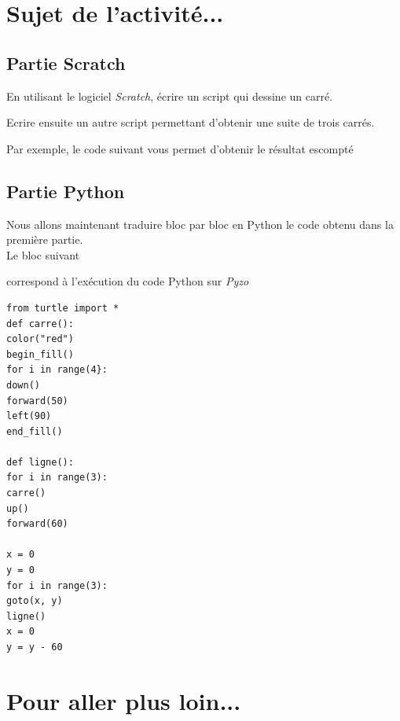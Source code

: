 \section{Sujet de l'activité...}



\subsection{Partie Scratch}

En utilisant le logiciel \emph{Scratch}, écrire un script qui dessine un carré.


Ecrire ensuite un autre script permettant d'obtenir une suite de trois carrés. 


Par exemple, le code suivant vous permet d'obtenir le résultat escompté


\subsection{Partie Python}

Nous allons maintenant traduire bloc par bloc en Python le code obtenu dans la première partie.\\

Le bloc suivant


correspond à l'exécution du code Python sur \emph{Pyzo}


\begin{verbatim}
from turtle import *
def carre():
color("red")
begin_fill()
for i in range(4}:
down()
forward(50)
left(90)
end_fill()

def ligne():
for i in range(3):
carre()
up()
forward(60)

x = 0
y = 0
for i in range(3):
goto(x, y)
ligne()
x = 0
y = y - 60
\end{verbatim}

\section{Pour aller plus loin...}
